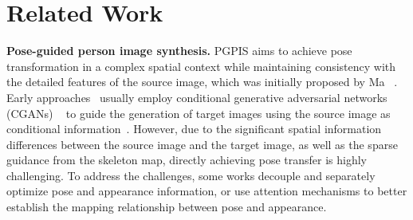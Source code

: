 \section{Related Work}
\label{sec:related_work}

\textbf{Pose-guided person image synthesis.}
PGPIS aims to achieve pose transformation in a complex spatial context while maintaining consistency with the detailed features of the source image, which was initially proposed by Ma \etal ~\cite{ma2017pose}. 
Early approaches~\cite{esser2018variational,ma2017pose} usually employ conditional generative adversarial networks (CGANs) ~\cite{goodfellow2014generative, mirza2014conditional} to guide the generation of target images using the source image as conditional information~\cite{ma2017pose,men2020controllable}. However, due to the significant spatial information differences between the source image and the target image, as well as the sparse guidance from the skeleton map, directly achieving pose transfer is highly challenging. To address the challenges, some works decouple and separately optimize pose and appearance information\cite{ma2018disentangled}, or use attention mechanisms to better establish the mapping relationship between pose and appearance\cite{ren2022neural,zhang2022exploring,zhou2021cocosnet}. 
